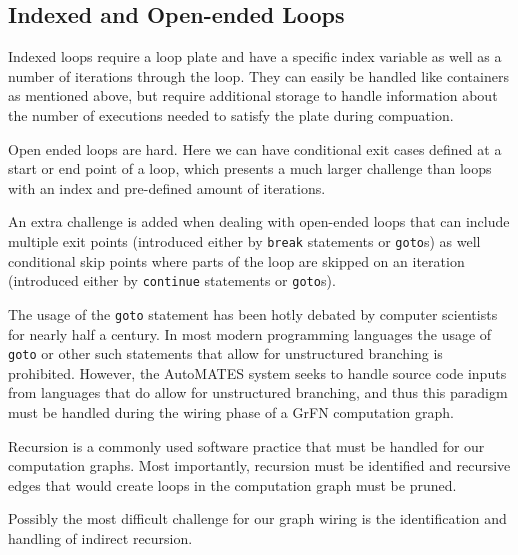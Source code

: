 \subsection{Indexed and Open-ended Loops\label{sec:loops}}
Indexed loops require a loop plate and have a specific index variable as well as a number of iterations through the loop. They can easily be handled like containers as mentioned above, but require additional storage to handle information about the number of executions needed to satisfy the plate during compuation.

Open ended loops are hard. Here we can have conditional exit cases defined at a start or end point of a loop, which presents a much larger challenge than loops with an index and pre-defined amount of iterations.

An extra challenge is added when dealing with open-ended loops that can include multiple exit points (introduced either by \texttt{break} statements or \texttt{goto}s) as well conditional skip points where parts of the loop are skipped on an iteration (introduced either by \texttt{continue} statements or \texttt{goto}s).

The usage of the \texttt{goto} statement has been hotly debated by computer scientists for nearly half a century. In most modern programming languages the usage of  \texttt{goto} or other such statements that allow for unstructured branching is prohibited. However, the AutoMATES system seeks to handle source code inputs from languages that do allow for unstructured branching, and thus this paradigm must be handled during the wiring phase of a GrFN computation graph.

Recursion is a commonly used software practice that must be handled for our computation graphs. Most importantly, recursion must be identified and recursive edges that would create loops in the computation graph must be pruned.

Possibly the most difficult challenge for our graph wiring is the identification and handling of indirect recursion.


